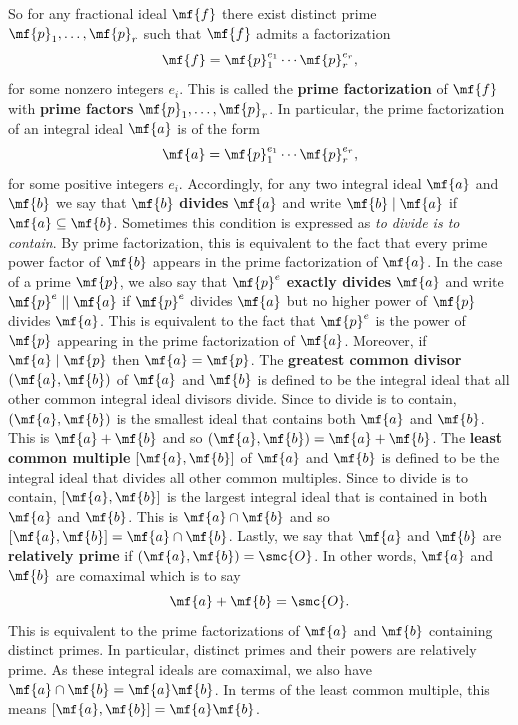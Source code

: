 \documentclass[12pt]{article}
\begin{document}
      So for any fractional ideal \(\mf{f}\) there exist distinct prime \(\mf{p}_{1},\ldots,\mf{p}_{r}\) such that \(\mf{f}\) admits a factorization
      \[
        \mf{f} = \mf{p}_{1}^{e_{1}} \cdots \mf{p}_{r}^{e_{r}},
      \]
      for some nonzero integers \(e_{i}\). This is called the \textbf{prime factorization} of \(\mf{f}\) with \textbf{prime factors} \(\mf{p}_{1},\ldots,\mf{p}_{r}\). In particular, the prime factorization of an integral ideal \(\mf{a}\) is of the form
      \[
        \mf{a} = \mf{p}_{1}^{e_{1}} \cdots \mf{p}_{r}^{e_{r}},
      \]
      for some positive integers \(e_{i}\). Accordingly, for any two integral ideal \(\mf{a}\) and \(\mf{b}\) we say that \(\mf{b}\) \textbf{divides} \(\mf{a}\) and write \(\mf{b} \mid \mf{a}\) if \(\mf{a} \subseteq \mf{b}\). Sometimes this condition is expressed as \textit{to divide is to contain}. By prime factorization, this is equivalent to the fact that every prime power factor of \(\mf{b}\) appears in the prime factorization of \(\mf{a}\). In the case of a prime \(\mf{p}\), we also say that \(\mf{p}^{e}\) \textbf{exactly divides} \(\mf{a}\) and write \(\mf{p}^{e} \mid\mid \mf{a}\) if \(\mf{p}^{e}\) divides \(\mf{a}\) but no higher power of \(\mf{p}\) divides \(\mf{a}\). This is equivalent to the fact that \(\mf{p}^{e}\) is the power of \(\mf{p}\) appearing in the prime factorization of \(\mf{a}\). Moreover, if \(\mf{a} \mid \mf{p}\) then \(\mf{a} = \mf{p}\). The \textbf{greatest common divisor} \((\mf{a},\mf{b})\) of \(\mf{a}\) and \(\mf{b}\) is defined to be the integral ideal that all other common integral ideal divisors divide. Since to divide is to contain, \((\mf{a},\mf{b})\) is the smallest ideal that contains both \(\mf{a}\) and \(\mf{b}\). This is \(\mf{a}+\mf{b}\) and so \((\mf{a},\mf{b}) = \mf{a}+\mf{b}\). The \textbf{least common multiple} \([\mf{a},\mf{b}]\) of \(\mf{a}\) and \(\mf{b}\) is defined to be the integral ideal that divides all other common multiples. Since to divide is to contain, \([\mf{a},\mf{b}]\) is the largest integral ideal that is contained in both \(\mf{a}\) and \(\mf{b}\). This is \(\mf{a} \cap \mf{b}\) and so \([\mf{a},\mf{b}] = \mf{a} \cap \mf{b}\). Lastly, we say that \(\mf{a}\) and \(\mf{b}\) are \textbf{relatively prime} if \((\mf{a},\mf{b}) = \smc{O}\). In other words, \(\mf{a}\) and \(\mf{b}\) are comaximal which is to say
      \[
        \mf{a}+\mf{b} = \smc{O}.
      \]
      This is equivalent to the prime factorizations of \(\mf{a}\) and \(\mf{b}\) containing distinct primes. In particular, distinct primes and their powers are relatively prime. As these integral ideals are comaximal, we also have \(\mf{a} \cap \mf{b} = \mf{a}\mf{b}\). In terms of the least common multiple, this means \([\mf{a},\mf{b}] = \mf{a}\mf{b}\).
      
\end{document}
